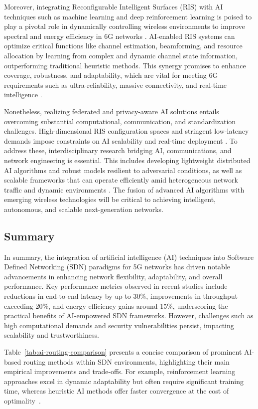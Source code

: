 \documentclass[sigconf]{acmart}
\begin{document}
Moreover, integrating Reconfigurable Intelligent Surfaces (RIS) with AI techniques such as machine learning and deep reinforcement learning is poised to play a pivotal role in dynamically controlling wireless environments to improve spectral and energy efficiency in 6G networks \cite{ref49}. AI-enabled RIS systems can optimize critical functions like channel estimation, beamforming, and resource allocation by learning from complex and dynamic channel state information, outperforming traditional heuristic methods. This synergy promises to enhance coverage, robustness, and adaptability, which are vital for meeting 6G requirements such as ultra-reliability, massive connectivity, and real-time intelligence \cite{ref49}.  

Nonetheless, realizing federated and privacy-aware AI solutions entails overcoming substantial computational, communication, and standardization challenges. High-dimensional RIS configuration spaces and stringent low-latency demands impose constraints on AI scalability and real-time deployment \cite{ref49,ref50}. To address these, interdisciplinary research bridging AI, communications, and network engineering is essential. This includes developing lightweight distributed AI algorithms and robust models resilient to adversarial conditions, as well as scalable frameworks that can operate efficiently amid heterogeneous network traffic and dynamic environments \cite{ref49,ref50,ref52}. The fusion of advanced AI algorithms with emerging wireless technologies will be critical to achieving intelligent, autonomous, and scalable next-generation networks.

\subsection{Summary}

In summary, the integration of artificial intelligence (AI) techniques into Software Defined Networking (SDN) paradigms for 5G networks has driven notable advancements in enhancing network flexibility, adaptability, and overall performance. Key performance metrics observed in recent studies include reductions in end-to-end latency by up to 30\%, improvements in throughput exceeding 20\%, and energy efficiency gains around 15\%, underscoring the practical benefits of AI-empowered SDN frameworks. However, challenges such as high computational demands and security vulnerabilities persist, impacting scalability and trustworthiness.

Table~\ref{tab:ai-routing-comparison} presents a concise comparison of prominent AI-based routing methods within SDN environments, highlighting their main empirical improvements and trade-offs. For example, reinforcement learning approaches excel in dynamic adaptability but often require significant training time, whereas heuristic AI methods offer faster convergence at the cost of optimality~\cite{ref1,ref2}.
\end{document}
